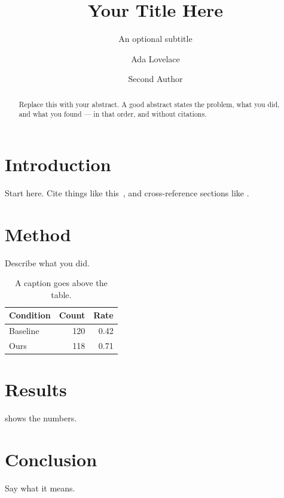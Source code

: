 \documentclass[sigconf]{acmart}
\begin{document}
\title{Your Title Here}
\subtitle{An optional subtitle}

\author{Ada Lovelace}

\author{Second Author}

\begin{abstract}
  Replace this with your abstract. A good abstract states the problem, what
  you did, and what you found --- in that order, and without citations.
\end{abstract}


\maketitle

\section{Introduction}
Start here. Cite things like this~\cite{knuth1984texbook}, and cross-reference
sections like .

\section{Method}
\label{sec:method}
Describe what you did.

\begin{table}[t]
  \caption{A caption goes above the table.}
  \label{tab:example}
  \begin{tabular}{lrr}
    \toprule
    Condition & Count & Rate \\
    \midrule
    Baseline  & 120   & 0.42 \\
    Ours      & 118   & 0.71 \\
    \bottomrule
  \end{tabular}
\end{table}

\section{Results}
 shows the numbers.

\section{Conclusion}
Say what it means.



\end{document}
